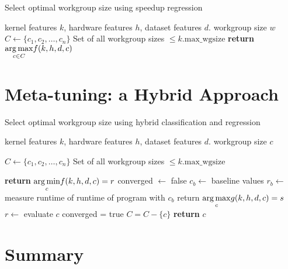 \begin{algorithm}
\caption{Select optimal workgroup size using speedup regression}
\label{alg:autotune-regression}
\begin{algorithmic}[1]
\Require kernel features $k$, hardware features $h$, dataset features
$d$.
\Ensure workgroup size $w$
\State $C \leftarrow \{c_1, c_2, \ldots, c_n \}$
\Comment Set of all workgroup sizes $\le k.\text{max\_wgsize}$
\State \textbf{return} $\underset{c \in C}{\operatorname*{arg\,max}} f(k,h,d,c)$
\end{algorithmic}
\end{algorithm}


\section{Meta-tuning: a Hybrid Approach}

\begin{algorithm}
\caption{Select optimal workgroup size using hybrid classification and regression}
\label{alg:autotune-hybrid}
\begin{algorithmic}[1]
\Require kernel features $k$, hardware features $h$, dataset features $d$.
\Ensure workgroup size $c$

\State $C \leftarrow \{ c_1, c_2,\ldots, c_n \}$
\Comment Set of all workgroup sizes $\le k.\text{max\_wgsize}$

    \State \textbf{return} $\underset{c}{\operatorname*{arg\,min}} f(k,h,d,c) = r$
\Else
   \State converged $\leftarrow$ false
   \State $c_b \leftarrow$ baseline values
   \State $r_b \leftarrow$ measure runtime of runtime of program with $c_b$
     \State return $\underset{c}{\operatorname*{arg\,max}} g(k,h,d,c) = s$
     \State $r \leftarrow$ evaluate $c$
       \State converged = true
     \Else
       \State $C = C - \{c\}$
     \EndIf
   \EndWhile
   \State \textbf{return} $c$
\EndIf
\end{algorithmic}
\end{algorithm}

\section{Summary}
